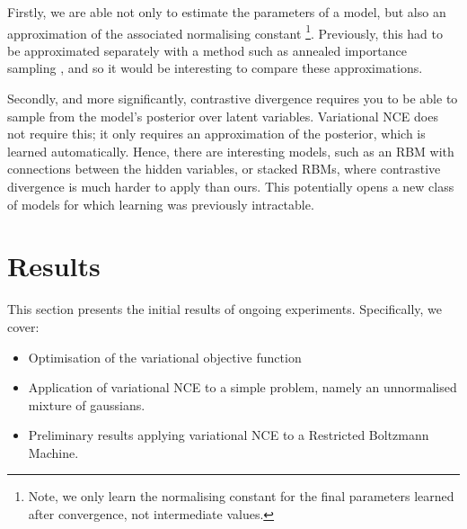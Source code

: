 \documentclass[11pt, oneside]{article}
\begin{document}
Firstly, we are able not only to estimate the parameters of a model, but also an approximation of the associated normalising constant \footnote{Note, we only learn the normalising constant for the final parameters learned after convergence, not intermediate values.}. Previously, this had to be approximated separately with a method such as annealed importance sampling \citep{salakhutdinov2008quantitative}, and so it would be interesting to compare these approximations.

Secondly, and more significantly, contrastive divergence requires you to be able to sample from the model's posterior over latent variables. Variational NCE does not require this; it only requires an approximation of the posterior, which is learned automatically. Hence, there are interesting models, such as an RBM with connections between the hidden variables, or stacked RBMs, where contrastive divergence is much harder to apply than ours. This potentially opens a new class of models for which learning was previously intractable.

\section{Results}
\label{sec:results}
This section presents the initial results of ongoing experiments. Specifically, we cover:
\begin{itemize}
    \item Optimisation of the variational objective function
    \item Application of variational NCE to a simple problem, namely an unnormalised mixture of gaussians.
    \item Preliminary results applying variational NCE to a Restricted Boltzmann Machine.
\end{itemize}
\end{document}
